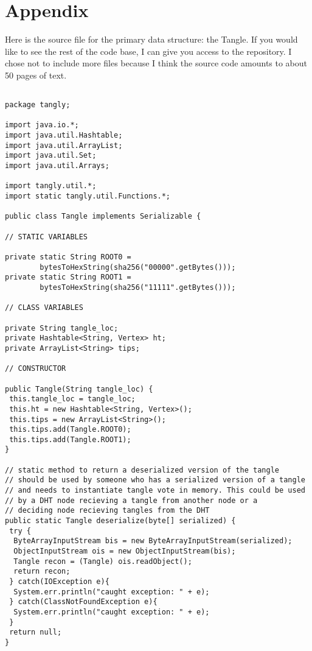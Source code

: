 \section{Appendix}
\label{sec:appendix}

Here is the source file for the primary data structure: the Tangle.
If you would like to see the rest of the code base, I can give you access to the repository.
I chose not to include more files because I think the source code amounts to about 50 pages of text.

\begin{Verbatim}

package tangly;

import java.io.*;
import java.util.Hashtable;
import java.util.ArrayList;
import java.util.Set;
import java.util.Arrays;

import tangly.util.*;
import static tangly.util.Functions.*;

public class Tangle implements Serializable {

// STATIC VARIABLES

private static String ROOT0 = 
        bytesToHexString(sha256("00000".getBytes()));	
private static String ROOT1 = 
        bytesToHexString(sha256("11111".getBytes()));

// CLASS VARIABLES

private String tangle_loc;
private Hashtable<String, Vertex> ht;
private ArrayList<String> tips;

// CONSTRUCTOR

public Tangle(String tangle_loc) {
 this.tangle_loc = tangle_loc;
 this.ht = new Hashtable<String, Vertex>();		
 this.tips = new ArrayList<String>();	
 this.tips.add(Tangle.ROOT0);
 this.tips.add(Tangle.ROOT1);
}

// static method to return a deserialized version of the tangle
// should be used by someone who has a serialized version of a tangle
// and needs to instantiate tangle vote in memory. This could be used
// by a DHT node recieving a tangle from another node or a 
// deciding node recieving tangles from the DHT
public static Tangle deserialize(byte[] serialized) {
 try {
  ByteArrayInputStream bis = new ByteArrayInputStream(serialized);
  ObjectInputStream ois = new ObjectInputStream(bis);
  Tangle recon = (Tangle) ois.readObject();
  return recon;
 } catch(IOException e){ 
  System.err.println("caught exception: " + e);
 } catch(ClassNotFoundException e){
  System.err.println("caught exception: " + e);
 }
 return null;
}


\end{Verbatim}
